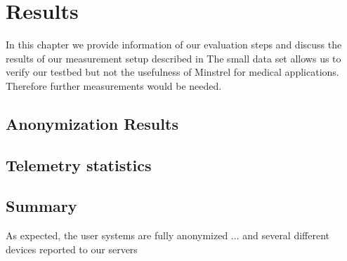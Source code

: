 \chapter{Results}
\label{chap:results}
In this chapter we provide information of our evaluation steps and discuss the results of our measurement setup described in 
The small data set allows us to verify our testbed but not the usefulness of Minstrel for medical applications. Therefore further measurements would be needed.\\


\section{Anonymization Results}
\label{sec:results:anon}
%




\section{Telemetry statistics}
\label{sec:results:telemetry}
%




\section{Summary}
As expected, the user systems are fully anonymized ... and several different devices reported to our servers
